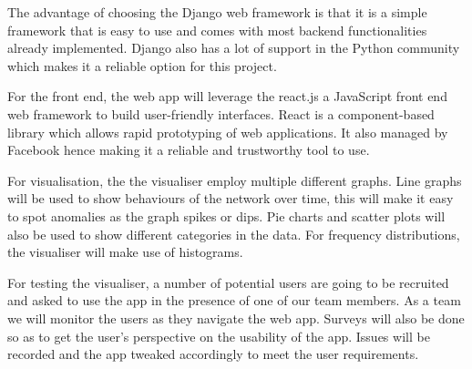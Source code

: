 The advantage of choosing the Django web framework is that it is a simple framework that is easy to use and comes with most backend functionalities already implemented. Django also has a lot of support in the Python community which makes it a reliable option for this project.

For the front end, the web app will leverage the react.js a JavaScript front end web framework to build user-friendly interfaces. React is a component-based library which allows rapid prototyping of web applications. It also managed by Facebook hence making it a reliable and trustworthy tool to use.

For visualisation, the the visualiser employ multiple different graphs. Line graphs will be used to show behaviours of the network over time, this will make it easy to spot anomalies as the graph spikes or dips. Pie charts and scatter plots will also be used to show different categories in the data. For frequency distributions, the visualiser will make use of histograms.

For testing the visualiser, a number of potential users are going to be recruited and asked to use the app in the presence of one of our team members. As a team we will monitor the users as they navigate the web app. Surveys will also be done so as to get the user's perspective on the usability of the app. Issues will be recorded and the app tweaked accordingly to meet the user requirements.
